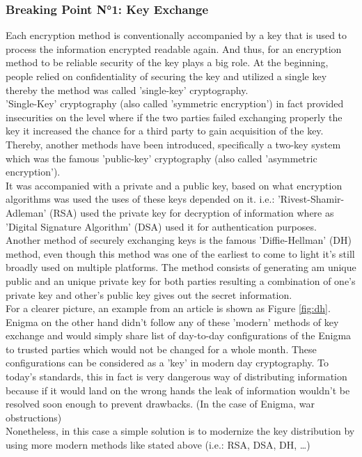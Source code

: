 \documentclass[conference,compsoc]{IEEEtran}
\begin{document}
\subsubsection{Breaking Point N°1: Key Exchange} Each encryption method is conventionally accompanied by a key that is used to process the information encrypted readable again. And thus, for an encryption method to be reliable security of the key plays a big role. At the beginning, people relied on confidentiality of securing the key and utilized a single key thereby the method was called 'single-key' cryptography.\\
'Single-Key' cryptography (also called 'symmetric encryption') in fact provided insecurities on the level where if the two parties failed exchanging properly the key it increased the chance for a third party to gain acquisition of the key.\\
Thereby, another methods have been introduced, specifically a two-key system which was the famous 'public-key' cryptography (also called 'asymmetric encryption').\\
It was accompanied with a private and a public key, based on what encryption algorithms was used the uses of these keys depended on it. i.e.: 'Rivest-Shamir-Adleman' (RSA) used the private key for decryption of information where as 'Digital Signature Algorithm' (DSA) used it for authentication purposes.\\
Another method of securely exchanging keys is the famous 'Diffie-Hellman' (DH) method, even though this method was one of the earliest to come to light it's still broadly used on multiple platforms. The method consists of generating am unique public and an unique private key for both parties resulting a combination of one's private key and other's public key gives out the secret information.\\
For a clearer picture, an example from an article is shown as Figure \ref{fig:dh}.\\
Enigma on the other hand didn't follow any of these 'modern' methods of key exchange and would simply share list of day-to-day configurations of the Enigma to trusted parties which would not be changed for a whole month. These configurations can be considered as a 'key' in modern day cryptography.
To today's standards, this in fact is very dangerous way of distributing information because if it would land on the wrong hands the leak of information wouldn't be resolved soon enough to prevent drawbacks. (In the case of Enigma, war obstructions)\\ 
Nonetheless, in this case a simple solution is to modernize the key distribution by using more modern methods like stated above (i.e.:  RSA, DSA, DH, \ldots)
\end{document}
